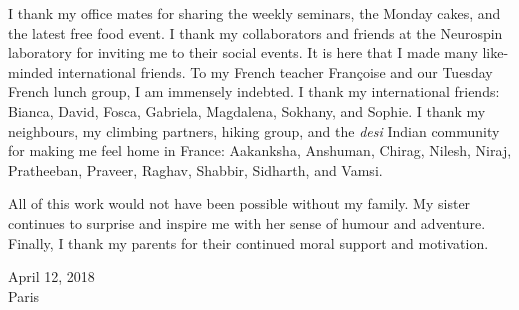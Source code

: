 I thank my office mates for sharing the weekly seminars, the Monday cakes, and the latest free food event. I thank my collaborators and friends at the Neurospin laboratory for inviting me to their social events. It is here that I made many like-minded international friends. To my French teacher Françoise and our Tuesday French lunch group, I am immensely indebted. I thank my international friends: Bianca, David, Fosca, Gabriela, Magdalena, Sokhany, and Sophie. I thank my neighbours, my climbing partners, hiking group, and the \textit{desi} Indian community for making me feel home in France: Aakanksha, Anshuman, Chirag, Nilesh, Niraj, Pratheeban, Praveer, Raghav, Shabbir, Sidharth, and Vamsi.

All of this work would not have been possible without my family. My sister continues to surprise and inspire me with her sense of humour and adventure. Finally, I thank my parents for their continued moral support and motivation.

\vspace{3em}
April 12, 2018 \\
Paris
